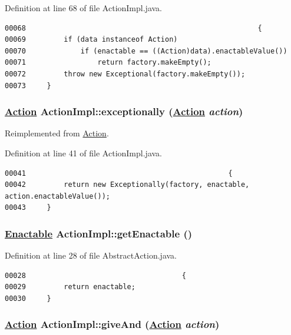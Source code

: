 Definition at line 68 of file Action\-Impl.java.\footnotesize\begin{verbatim}00068                                                       {
00069         if (data instanceof Action)
00070             if (enactable == ((Action)data).enactableValue())
00071                 return factory.makeEmpty();
00072         throw new Exceptional(factory.makeEmpty());
00073     }
\end{verbatim}\normalsize 
\hypertarget{classActionImpl_a15}{
\subsubsection[exceptionally]{\setlength{\rightskip}{0pt plus 5cm}\hyperlink{interfaceAction}{Action} Action\-Impl::exceptionally (\hyperlink{interfaceAction}{Action} {\em action})}}
\label{classActionImpl_a15}




Reimplemented from \hyperlink{interfaceAction_a5}{Action}.

Definition at line 41 of file Action\-Impl.java.\footnotesize\begin{verbatim}00041                                                {
00042         return new Exceptionally(factory, enactable, action.enactableValue());
00043     }
\end{verbatim}\normalsize 
\hypertarget{classActionImpl_a0}{
\subsubsection[getEnactable]{\setlength{\rightskip}{0pt plus 5cm}\hyperlink{interfaceEnactable}{Enactable} Action\-Impl::get\-Enactable ()}}
\label{classActionImpl_a0}




Definition at line 28 of file Abstract\-Action.java.\footnotesize\begin{verbatim}00028                                     {
00029         return enactable;
00030     }
\end{verbatim}\normalsize 
\hypertarget{classActionImpl_a4}{
\subsubsection[giveAnd]{\setlength{\rightskip}{0pt plus 5cm}\hyperlink{interfaceAction}{Action} Action\-Impl::give\-And (\hyperlink{interfaceAction}{Action} {\em action})}}
\label{classActionImpl_a4}




